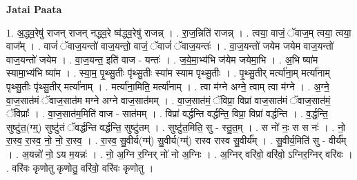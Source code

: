 \documentclass[17pt]{extarticle}
\begin{document}
\textbf{Jatai Paata} \newline

1. अ॒द्ध्व॒रेषु॑ राजन् राजन् नद्ध्व॒रे ष्व॑द्ध्व॒रेषु॑ राजन्न् । . रा॒ज॒न्निति॑ राजन्न् । . त्वया॒ वाजं॒ ॅवाज॒म् त्वया॒ त्वया॒ वाज᳚म् । . वाजं॑ ॅवाज॒यन्तो॑ वाज॒यन्तो॒ वाजं॒ ॅवाजं॑ ॅवाज॒यन्तः॑ । . वा॒ज॒यन्तो॑ जयेम जयेम वाज॒यन्तो॑ वाज॒यन्तो॑ जयेम । . वा॒ज॒यन्त॒ इति॑ वाज - यन्तः॑ । . ज॒ये॒मा॒भ्य॑भि ज॑येम जयेमा॒भि । . अ॒भि ष्या॑म स्यामा॒भ्य॑भि ष्या॑म । . स्या॒म॒ पृ॒थ्सु॒तीः पृ॑थ्सु॒तीः स्या॑म स्याम पृथ्सु॒तीः । . पृ॒थ्सु॒तीर् मर्त्या॑ना॒म् मर्त्या॑नाम् पृथ्सु॒तीः पृ॑थ्सु॒तीर् मर्त्या॑नाम् । . मर्त्या॑ना॒मिति॒ मर्त्या॑नाम् । . त्वा म॑ग्ने अग्ने॒ त्वाम् त्वा म॑ग्ने । . अ॒ग्ने॒ वा॒ज॒सात॑मं ॅवाज॒सात॑म मग्ने अग्ने वाज॒सात॑मम् । . वा॒ज॒सात॑मं॒ ॅविप्रा॒ विप्रा॑ वाज॒सात॑मं ॅवाज॒सात॑मं॒ ॅविप्राः᳚ । . वा॒ज॒सात॑म॒मिति॑ वाज - सात॑मम् । . विप्रा॑ वर्द्धन्ति वर्द्धन्ति॒ विप्रा॒ विप्रा॑ वर्द्धन्ति । . व॒र्द्ध॒न्ति॒ सुष्टु॑त॒(ग्म्॒) सुष्टु॑तं ॅवर्द्धन्ति वर्द्धन्ति॒ सुष्टु॑तम् । . सुष्टु॑त॒मिति॒ सु - स्तु॒त॒म् । . स नो॑ नः॒ स स नः॑ । . नो॒ रा॒स्व॒ रा॒स्व॒ नो॒ नो॒ रा॒स्व॒ । . रा॒स्व॒ सु॒वीर्य(ग्म्॑) सु॒वीर्य(ग्म्॑) रास्व रास्व सु॒वीर्य᳚म् । . सु॒वीर्य॒मिति॑ सु - वीर्य᳚म् । . अ॒यन्नो॑ नो॒ ऽय म॒यन्नः॑ । . नो॒ अ॒ग्नि र॒ग्निर् नो॑ नो अ॒ग्निः । . अ॒ग्निर् वरि॑वो॒ वरि॑वो॒ ऽग्निर॒ग्निर् वरि॑वः । . वरि॑वः कृणोतु कृणोतु॒ वरि॑वो॒ वरि॑वः कृणोतु । \newline
\end{document}
